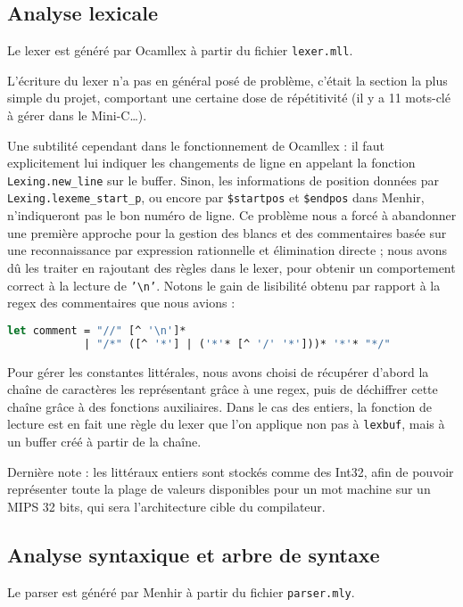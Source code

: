 \documentclass[a4paper, 11pt]{article}
\begin{document}
\subsection{Analyse lexicale}

Le lexer est généré par Ocamllex à partir du fichier \texttt{lexer.mll}.

L'écriture du lexer n'a pas en général posé de problème, c'était la section la plus
simple du projet, comportant une certaine dose de répétitivité (il y a 11 mots-clé à
gérer dans le Mini-C\ldots).

Une subtilité cependant dans le fonctionnement de Ocamllex : il faut explicitement lui
indiquer les changements de ligne en appelant la fonction \texttt{Lexing.new\_line} sur
le buffer. Sinon, les informations de position données par \texttt{Lexing.lexeme\_start\_p},
ou encore par \texttt{\$startpos} et \texttt{\$endpos} dans Menhir, n'indiqueront pas
le bon numéro de ligne. Ce problème nous a forcé à abandonner une première approche pour
la gestion des blancs et des commentaires basée sur une reconnaissance par expression
rationnelle et élimination directe ; nous avons dû les traiter en rajoutant des règles
dans le lexer, pour obtenir un comportement correct à la lecture de \texttt{'\textbackslash n'}.
Notons le gain de lisibilité obtenu par rapport à la regex des commentaires que nous avions :
\begin{lstlisting}[language=Caml]
let comment = "//" [^ '\n']*
            | "/*" ([^ '*'] | ('*'* [^ '/' '*']))* '*'* "*/"
\end{lstlisting}

Pour gérer les constantes littérales, nous avons choisi de récupérer d'abord la chaîne
de caractères les représentant grâce à une regex, puis de déchiffrer cette chaîne grâce
à des fonctions auxiliaires. Dans le cas des entiers, la fonction de lecture est en fait
une règle du lexer que l'on applique non pas à \texttt{lexbuf}, mais à un buffer créé
à partir de la chaîne.

Dernière note : les littéraux entiers sont stockés comme des Int32, afin de pouvoir
représenter toute la plage de valeurs disponibles pour un mot machine sur un MIPS 32 bits,
qui sera l'architecture cible du compilateur.

\subsection{Analyse syntaxique et arbre de syntaxe}

Le parser est généré par Menhir à partir du fichier \texttt{parser.mly}.
\end{document}
